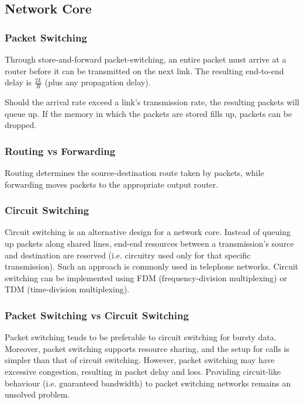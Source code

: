 \documentclass[12pt,titlepage]{article}
\begin{document}
    \subsection{Network Core}
      \subsubsection{Packet Switching}
        Through store-and-forward packet-switching, an entire packet must arrive at a router before it can be transmitted on the next link. The
        resulting end-to-end delay is $\frac{2L}{R}$ (plus any propagation delay).

        Should the arrival rate exceed a link's transmission rate, the resulting packets will queue up. If the memory in which the packets are
        stored fills up, packets can be dropped.

      \subsubsection{Routing vs Forwarding}
        Routing determines the source-destination route taken by packets, while forwarding moves packets to the appropriate output router.

      \subsubsection{Circuit Switching}
        Circuit switching is an alternative design for a network core. Instead of queuing up packets along shared lines, end-end resources
        between a transmission's source and destination are reserved (i.e. circuitry used only for that specific transmission). Such an approach
        is commonly used in telephone networks. Circuit switching can be implemented using FDM (frequency-division multiplexing) or TDM
        (time-division multiplexing).

      \subsubsection{Packet Switching vs Circuit Switching}
        Packet switching tends to be preferable to circuit switching for bursty data. Moreover, packet switching supports resource sharing,
        and the setup for calls is simpler than that of circuit switching. However, packet switching may have excessive congestion, resulting
        in packet delay and loss. Providing circuit-like behaviour (i.e. guaranteed bandwidth) to packet switching networks remains an unsolved
        problem.
\end{document}
